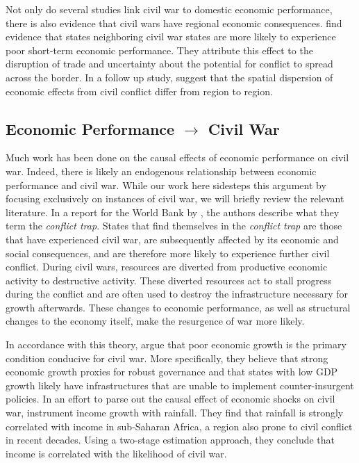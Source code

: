 Not only do several studies link civil war to domestic economic performance, there is also evidence that civil wars have regional economic consequences. \citet{murdoch:sandler:2002a} find evidence that states neighboring civil war states are more likely to experience poor short-term economic performance. They attribute this effect to the disruption of trade and uncertainty about the potential for conflict to spread across the border. In a follow up study, \citet{murdoch:sandler:2002b} suggest that the spatial dispersion of economic effects from civil conflict differ from region to region.

\subsection{Economic Performance $\rightarrow$ Civil War}

Much work has been done on the causal effects of economic performance on civil war. Indeed, there is likely an endogenous relationship between economic performance and civil war. While our work here sidesteps this argument by focusing exclusively on instances of civil war, we will briefly review the relevant literature. In a report for the World Bank by \citet{collier:etal:2003}, the authors describe what they term the \textit{conflict trap}. States that find themselves in the \textit{conflict trap} are those that have experienced civil war, are subsequently affected by its economic and social consequences, and are therefore more likely to experience further civil conflict. During civil wars, resources are diverted from productive economic activity to destructive activity. These diverted resources act to stall progress during the conflict and are often used to destroy the infrastructure necessary for growth afterwards. These changes to economic performance, as well as structural changes to the economy itself, make the resurgence of war more likely. 

In accordance with this theory, \citet{fearon:laitin:2003} argue that poor economic growth is the primary condition conducive for civil war. More specifically, they believe that strong economic growth proxies for robust governance and that states with low GDP growth likely have infrastructures that are unable to implement counter-insurgent policies. In an effort to parse out the causal effect of economic shocks on civil war, \citet{miguel:etal:2004} instrument income growth with rainfall. They find that rainfall is strongly correlated with income in sub-Saharan Africa, a region also prone to civil conflict in recent decades.  Using a two-stage estimation approach, they conclude that income is correlated with the likelihood of civil war.

